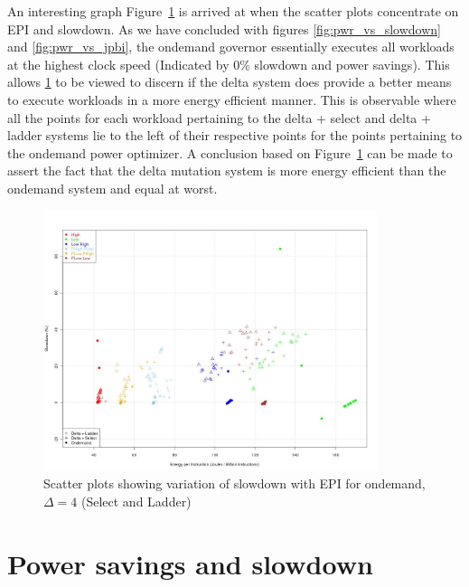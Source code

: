An interesting graph Figure~\ref{fig:jpbi_vs_slowdown} is arrived at when the scatter plots concentrate on
EPI and slowdown. As we have concluded with figures \ref{fig:pwr_vs_slowdown} and \ref{fig:pwr_vs_jpbi},
the ondemand governor essentially executes all workloads at the highest clock speed (Indicated by 0\% slowdown 
and power savings). This allows \ref{fig:jpbi_vs_slowdown} to be viewed to discern if the delta system
does provide a better means to execute workloads in a more energy efficient manner. This is observable
where all the points for each workload pertaining to the delta + select and delta + ladder systems lie to the left of their
respective points for the points pertaining to the ondemand power optimizer. A conclusion based on 
Figure~\ref{fig:jpbi_vs_slowdown} can be made to assert the fact that the delta mutation system is more 
energy efficient than the ondemand system and equal at worst.

\begin{figure}[h!]
  \begin{center}
    \includegraphics[height=3.0in]{figures/jpbi_vs_slowdown_delta_4.jpg}
    \caption{Scatter plots showing variation of slowdown with EPI for ondemand, $\Delta=4$ (Select and Ladder)}
    \label{fig:jpbi_vs_slowdown}
  \end{center}
\end{figure}

\section{Power savings and slowdown}~\label{sec:pow_slow}

